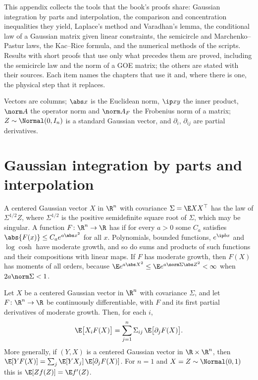 \begin{refsection}

This appendix collects the tools that the book's proofs share: Gaussian integration by parts and interpolation, the comparison and concentration inequalities they yield, Laplace's method and Varadhan's lemma, the conditional law of a Gaussian matrix given linear constraints, the semicircle and Marchenko--Pastur laws, the Kac--Rice formula, and the numerical methods of the scripts. Results with short proofs that use only what precedes them are proved, including the semicircle law and the norm of a GOE matrix; the others are stated with their sources. Each item names the chapters that use it and, where there is one, the physical step that it replaces.

Vectors are columns; $\abs x$ is the Euclidean norm, $\ip xy$ the inner product, $\norm A$ the operator norm and $\norm A_F$ the Frobenius norm of a matrix; $Z\sim\Normal(0,I_n)$ is a standard Gaussian vector, and $\partial_i$, $\partial_{ij}$ are partial derivatives.

\section{Gaussian integration by parts and interpolation}\label{sec:toolkit:gaussian}

A centered Gaussian vector $X$ in $\R^n$ with covariance $\Sigma=\E XX^\top$ has the law of $\Sigma^{1/2}Z$, where $\Sigma^{1/2}$ is the positive semidefinite square root of $\Sigma$, which may be singular. A function $F\colon\R^n\to\R$ has  if for every $a>0$ some $C_a$ satisfies $\abs{F(x)}\le C_ae^{a\abs x^2}$ for all $x$. Polynomials, bounded functions, $e^{\ip bx}$ and $\log\cosh$ have moderate growth, and so do sums and products of such functions and their compositions with linear maps. If $F$ has moderate growth, then $F(X)$ has moments of all orders, because $\E e^{a\abs X^2}\le\E e^{a\norm\Sigma\abs Z^2}<\infty$ when $2a\norm\Sigma<1$.

\begin{theorem}\label{thm:toolkit:gaussianibp}
Let $X$ be a centered Gaussian vector in $\R^n$ with covariance $\Sigma$, and let $F\colon\R^n\to\R$ be continuously differentiable, with $F$ and its first partial derivatives of moderate growth. Then, for each $i$,
\begin{equation}\label{eq:toolkit:ibp}
\E\bigl[X_iF(X)\bigr]=\sum_{j=1}^n\Sigma_{ij}\,\E\bigl[\partial_jF(X)\bigr].
\end{equation}
More generally, if $(Y,X)$ is a centered Gaussian vector in $\R\times\R^n$, then $\E[YF(X)]=\sum_j\E[YX_j]\,\E[\partial_jF(X)]$. For $n=1$ and $X=Z\sim\Normal(0,1)$ this is  $\E[Zf(Z)]=\E f'(Z)$.
\end{theorem}


\end{refsection}
